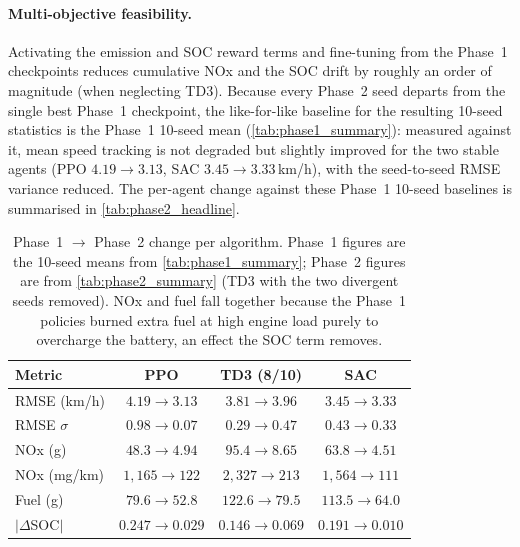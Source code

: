 \paragraph{Multi-objective feasibility.}
Activating the emission and \ac{SOC} reward terms and fine-tuning from the Phase~1 checkpoints reduces cumulative \ac{NOx} and the \ac{SOC} drift by roughly an order of magnitude (when neglecting TD3). Because every Phase~2 seed departs from the single best Phase~1 checkpoint, the like-for-like baseline for the resulting 10-seed statistics is the Phase~1 10-seed mean (\autoref{tab:phase1_summary}): measured against it, mean speed tracking is not degraded but slightly improved for the two stable agents (PPO $4.19 \to 3.13$, SAC $3.45 \to 3.33$\,km/h), with the seed-to-seed \ac{RMSE} variance reduced. The per-agent change against these Phase~1 10-seed baselines is summarised in \autoref{tab:phase2_headline}.

\begin{table}[H]
  \centering
  \small
  \begin{tabular}{lccc}
    \hline
    \textbf{Metric} & \textbf{PPO} & \textbf{TD3 (8/10)} & \textbf{SAC} \\
    \hline
    \ac{RMSE} (km/h)     & $4.19 \to 3.13$ & $3.81 \to 3.96$ & $3.45 \to 3.33$ \\
    \ac{RMSE} $\sigma$   & $0.98 \to \mathbf{0.07}$ & $0.29 \to 0.47$ & $0.43 \to 0.33$ \\
    \ac{NOx} (g)         & $48.3 \to \mathbf{4.94}$ & $95.4 \to 8.65$ & $63.8 \to \mathbf{4.51}$ \\
    \ac{NOx} (mg/km)     & $1{,}165 \to 122$ & $2{,}327 \to 213$ & $1{,}564 \to 111$ \\
    Fuel (g)             & $79.6 \to 52.8$ & $122.6 \to 79.5$ & $113.5 \to 64.0$ \\
    $|\Delta$\ac{SOC}$|$ & $0.247 \to \mathbf{0.029}$ & $0.146 \to 0.069$ & $0.191 \to \mathbf{0.010}$ \\
    \hline
  \end{tabular}
  \caption[Phase~1 to Phase~2 headline changes]{Phase~1 $\to$ Phase~2 change per algorithm. Phase~1 figures are the 10-seed means from \autoref{tab:phase1_summary}; Phase~2 figures are from \autoref{tab:phase2_summary} (TD3 with the two divergent seeds removed). \ac{NOx} and fuel fall together because the Phase~1 policies burned extra fuel at high engine load purely to overcharge the battery, an effect the \ac{SOC} term removes.}
  \label{tab:phase2_headline}
\end{table}

